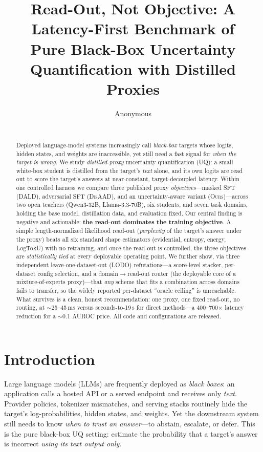 \documentclass[11pt]{article}
\title{Read-Out, Not Objective: A Latency-First Benchmark of \\
Pure Black-Box Uncertainty Quantification with Distilled Proxies}
\author{Anonymous \\
  \texttt{} \\}
\newcommand{\ours}{\textsc{Ours}}
\newcommand{\dald}{\textsc{DALD}}
\newcommand{\disaad}{\textsc{DisAAD}}
\begin{document}
\maketitle

\begin{abstract}
Deployed language-model systems increasingly call \emph{black-box} targets whose
logits, hidden states, and weights are inaccessible, yet still need a fast signal
for \emph{when the target is wrong}. We study \emph{distilled-proxy} uncertainty
quantification (UQ): a small white-box student is distilled from the target's
\emph{text} alone, and its own logits are read out to score the target's answers at
near-constant, target-decoupled latency. Within one controlled harness we compare
three published proxy \emph{objectives}---masked SFT (\dald), adversarial SFT
(\disaad), and an uncertainty-aware variant (\ours)---across two open teachers
(Qwen3-32B, Llama-3.3-70B), six students, and seven task domains, holding the base
model, distillation data, and evaluation fixed. Our central finding is negative and
actionable: \textbf{the read-out dominates the training objective}. A simple
length-normalized likelihood read-out (\emph{perplexity} of the target's answer under
the proxy) beats all six standard shape estimators (evidential, entropy, energy,
LogTokU) with no retraining, and once the read-out is controlled, the three objectives
are \emph{statistically tied} at every deployable operating point. We further show,
via three independent leave-one-dataset-out (LODO) refutations---a score-level
stacker, per-dataset config selection, and a domain$\rightarrow$read-out router (the
deployable core of a mixture-of-experts proxy)---that \emph{any} scheme that fits a
combination across domains fails to transfer, so the widely reported per-dataset
``oracle ceiling'' is unreachable. What survives is a clean, honest recommendation:
one proxy, one fixed read-out, no routing, at $\sim$25--45\,ms versus seconds-to-19\,s
for direct methods---a 400--700$\times$ latency reduction for a $\sim$0.1 AUROC price.
All code and configurations are released.
\end{abstract}

\section{Introduction}
Large language models (LLMs) are frequently deployed as \emph{black boxes}: an
application calls a hosted API or a served endpoint and receives only \emph{text}.
Provider policies, tokenizer mismatches, and serving stacks routinely hide the
target's log-probabilities, hidden states, and weights. Yet the downstream system
still needs to know \emph{when to trust an answer}---to abstain, escalate, or defer.
This is the pure black-box UQ setting: estimate the probability that a target's answer
is incorrect \emph{using its text output only}.
\end{document}
